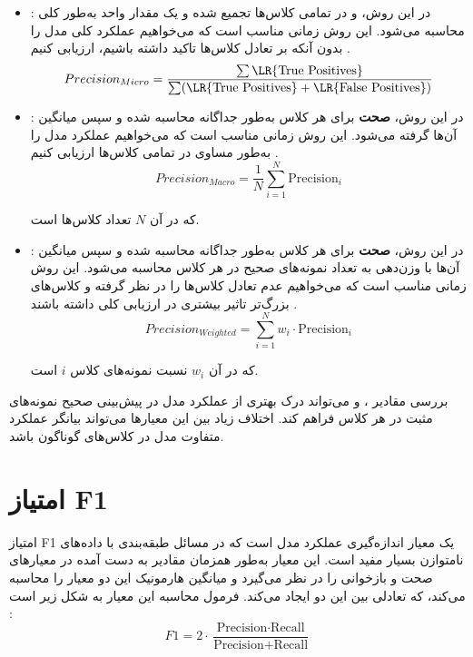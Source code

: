 \begin{itemize}
	\item \textbf{}: در این روش، \textbf{} و \textbf{} در تمامی کلاس‌ها تجمیع شده و یک مقدار واحد به‌طور کلی محاسبه می‌شود. این روش زمانی مناسب است که می‌خواهیم عملکرد کلی مدل را بدون آنکه بر تعادل کلاس‌ها تاکید داشته باشیم، ارزیابی کنیم \cite{ref_sokolova2009}.
	\begin{equation}
		Precision_{Micro} = \frac{\sum \text{\LR{True Positives}}}{\sum (\text{\LR{True Positives}} + \text{\LR{False Positives}})}
	\end{equation}
	\item \textbf{}: در این روش، \textbf{صحت} برای هر کلاس به‌طور جداگانه محاسبه شده و سپس میانگین آن‌ها گرفته می‌شود. این روش زمانی مناسب است که می‌خواهیم عملکرد مدل را به‌طور مساوی در تمامی کلاس‌ها ارزیابی کنیم \cite{ref_sokolova2009}.
	\begin{equation}
		Precision_{Macro} = \frac{1}{N} \sum_{i=1}^{N} \text{Precision}_i
	\end{equation}
	
	که در آن \( N \) تعداد کلاس‌ها است.
	
	\item \textbf{}: در این روش، \textbf{صحت} برای هر کلاس به‌طور جداگانه محاسبه شده و سپس میانگین آن‌ها با وزن‌دهی به تعداد نمونه‌های صحیح در هر کلاس محاسبه می‌شود. این روش زمانی مناسب است که می‌خواهیم عدم تعادل کلاس‌ها را در نظر گرفته و کلاس‌های بزرگ‌تر تاثیر بیشتری در ارزیابی کلی داشته باشند \cite{ref_sokolova2009}.
	\begin{equation}
		Precision_{Weighted} = \sum_{i=1}^{N} w_i \cdot \text{Precision}_i
	\end{equation}
	
	که در آن \( w_i \) نسبت نمونه‌های کلاس \( i \) است.
\end{itemize}

بررسی مقادیر ،  و  می‌تواند درک بهتری از عملکرد مدل در پیش‌بینی صحیح نمونه‌های مثبت در هر کلاس فراهم کند. اختلاف زیاد بین این معیارها می‌تواند بیانگر عملکرد متفاوت مدل در کلاس‌های گوناگون باشد.

\section{امتیاز F1}

امتیاز F1 یک معیار اندازه‌گیری عملکرد مدل است که در مسائل طبقه‌بندی با داده‌های نامتوازن بسیار مفید است. این معیار به‌طور همزمان مقادیر به دست آمده در معیارهای صحت و بازخوانی را در نظر می‌گیرد و میانگین هارمونیک این دو معیار را محاسبه می‌کند، که تعادلی بین این دو ایجاد می‌کند. فرمول محاسبه این معیار به شکل زیر است \cite{ref_manning2008}:
\begin{equation}
	F1 = 2 \cdot \frac{\text{Precision} \cdot \text{Recall}}{\text{Precision} + \text{Recall}}
\end{equation}


